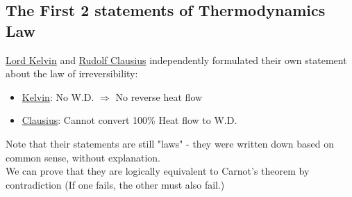 \documentclass[class=article, crop=false, 12pt]{standalone}
\begin{document}
\subsection{The First 2 statements of Thermodynamics  Law}

\href{https://en.wikipedia.org/wiki/Lord_Kelvin}{Lord Kelvin} 
and 
\href{https://en.wikipedia.org/wiki/Rudolf_Clausius}{Rudolf Clausius} 
independently formulated their own statement
about the law of irreversibility:
\begin{itemize}
    \item \ul{Kelvin}: No W.D. $\Rightarrow$ No reverse heat flow
    \item \ul{Clausius}: Cannot convert 100\% Heat flow to W.D.
\end{itemize}

Note that their statements are still "laws" - 
they were written down based on common sense, without explanation.\\

We can prove that they are logically equivalent to Carnot's theorem by contradiction 
(If one fails, the other must also fail.)
\end{document}
